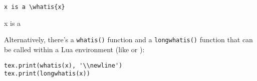 \documentclass{article}
\begin{document}
\begin{codebox}
    \begin{verbatim}
x is a \whatis{x}
    \end{verbatim}
    \tcblower
    x is a 
\end{codebox}

Alternatively, there's a \texttt{whatis()} function and a \texttt{longwhatis()} function that can be called within a Lua environment (like \texttt{\directlua} or \texttt{\luaexec}):

\begin{codebox}
\begin{verbatim}
tex.print(whatis(x), '\\newline')
tex.print(longwhatis(x))
\end{verbatim}
\tcblower
{}
\end{codebox}
\end{document}

